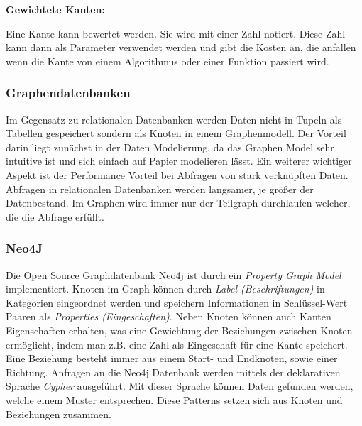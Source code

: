 	\textbf{Gewichtete Kanten:}
	
	Eine Kante kann bewertet werden. Sie wird mit einer Zahl notiert. Diese Zahl kann dann als Parameter verwendet werden und gibt die Kosten an, die anfallen wenn die Kante von einem Algorithmus oder einer Funktion passiert wird.
	\cite[18]{Krumke2012}
	
	
	
	\subsubsection{Graphendatenbanken}	
	Im Gegensatz zu relationalen Datenbanken werden Daten nicht in Tupeln als Tabellen gespeichert sondern als Knoten in einem Graphenmodell. Der Vorteil darin liegt zunächst in der Daten Modelierung, da das Graphen Model sehr intuitive ist und sich einfach auf Papier modelieren lässt. 
	Ein weiterer wichtiger Aspekt ist der Performance Vorteil bei Abfragen von stark verknüpften Daten. Abfragen in relationalen Datenbanken werden langsamer, je größer der Datenbestand. Im Graphen wird immer nur der Teilgraph durchlaufen welcher, die die Abfrage erfüllt.\cite[8]{robinson_webber_eifrem_2015}
	
	\subsubsection{Neo4J}
	
	Die Open Source Graphdatenbank Neo4j ist durch ein \textit{Property Graph Model} implementiert. Knoten im Graph können durch \emph{Label (Beschriftungen)} in Kategorien eingeordnet werden und speichern Informationen in Schlüssel-Wert Paaren als \emph{Properties (Eingeschaften)}. 
	Neben Knoten können auch Kanten Eigenschaften erhalten, was eine Gewichtung der Beziehungen zwischen Knoten ermöglicht, indem man z.B. eine Zahl als Eingeschaft für eine Kante speichert. Eine Beziehung besteht immer aus einem Start- und Endknoten, sowie einer Richtung.\cite[26]{Robinson2015}
	Anfragen an die Neo4j Datenbank werden mittels der deklarativen Sprache \textit{Cypher} ausgeführt. Mit dieser Sprache können Daten gefunden werden, welche einem Muster  entsprechen. Diese Patterns setzen sich aus Knoten und Beziehungen zusammen.\newline
	
% 

